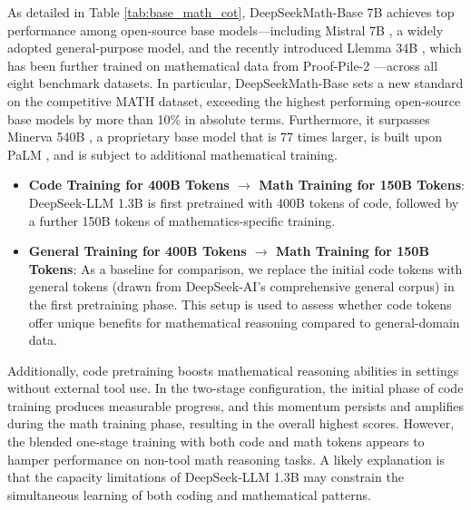 As detailed in Table \ref{tab:base_math_cot}, DeepSeekMath-Base 7B achieves top performance among open-source base models—including Mistral 7B \citep{mistral}, a widely adopted general-purpose model, and the recently introduced Llemma 34B \citep{llemma}, which has been further trained on mathematical data from Proof-Pile-2 \citep{llemma}—across all eight benchmark datasets. In particular, DeepSeekMath-Base sets a new standard on the competitive MATH dataset, exceeding the highest performing open-source base models by more than 10\% in absolute terms. Furthermore, it surpasses Minerva 540B \citep{minerva}, a proprietary base model that is 77 times larger, is built upon PaLM \citep{palm}, and is subject to additional mathematical training.

\begin{itemize}[topsep=0pt]
    \item \textbf{Code Training for 400B Tokens $\rightarrow$ Math Training for 150B Tokens}: DeepSeek-LLM 1.3B is first pretrained with 400B tokens of code, followed by a further 150B tokens of mathematics-specific training.
    \item \textbf{General Training for 400B Tokens $\rightarrow$ Math Training for 150B Tokens}: As a baseline for comparison, we replace the initial code tokens with general tokens (drawn from DeepSeek-AI’s comprehensive general corpus) in the first pretraining phase. This setup is used to assess whether code tokens offer unique benefits for mathematical reasoning compared to general-domain data.
\end{itemize}

Additionally, code pretraining boosts mathematical reasoning abilities in settings without external tool use. In the two-stage configuration, the initial phase of code training produces measurable progress, and this momentum persists and amplifies during the math training phase, resulting in the overall highest scores. However, the blended one-stage training with both code and math tokens appears to hamper performance on non-tool math reasoning tasks. A likely explanation is that the capacity limitations of DeepSeek-LLM 1.3B may constrain the simultaneous learning of both coding and mathematical patterns.

